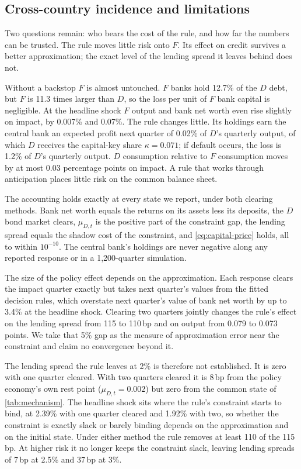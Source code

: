 \subsection{Cross-country incidence and limitations}
\label{sec:res-incidence}

Two questions remain: who bears the cost of the rule, and how far the numbers can be trusted.
The rule moves little risk onto $F$. Its effect on credit survives a better approximation; the
exact level of the lending spread it leaves behind does not.

Without a backstop $F$ is almost untouched. $F$ banks hold 12.7\% of the $D$ debt, but $F$ is
11.3 times larger than $D$, so the loss per unit of $F$ bank capital is negligible. At the
headline shock $F$ output and bank net worth even rise slightly on impact, by 0.007\% and
0.07\%. The rule changes little. Its holdings earn the central bank an expected profit next
quarter of 0.02\% of $D$'s quarterly output, of which $D$ receives the capital-key share
$\kappa=0.071$; if default occurs, the loss is 1.2\% of $D$'s quarterly output. $D$ consumption
relative to $F$ consumption moves by at most 0.03 percentage points on impact. A rule that works
through anticipation places little risk on the common balance sheet.

The accounting holds exactly at every state we report, under both clearing methods. Bank net
worth equals the returns on its assets less its deposits, the $D$ bond market clears, $\mu_{D,t}$
is the positive part of the constraint gap, the lending spread equals the shadow cost of the
constraint, and \eqref{eq:capital-price} holds, all to within $10^{-10}$. The central bank's
holdings are never negative along any reported response or in a 1,200-quarter simulation.

The size of the policy effect depends on the approximation. Each response clears the impact
quarter exactly but takes next quarter's values from the fitted decision rules, which overstate
next quarter's value of bank net worth by up to 3.4\% at the headline shock. Clearing two
quarters jointly changes the rule's effect on the lending spread from 115 to 110\,bp and on
output from 0.079 to 0.073 points. We take that 5\% gap as the measure of approximation error
near the constraint and claim no convergence beyond it.

The lending spread the rule leaves at 2\% is therefore not established. It is zero with one
quarter cleared. With two quarters cleared it is 8\,bp from the policy economy's own rest point
($\mu_{D,t}=0.002$) but zero from the common state of \cref{tab:mechanism}. The headline shock
sits where the rule's constraint starts to bind, at 2.39\% with one quarter cleared and 1.92\%
with two, so whether the constraint is exactly slack or barely binding depends on the
approximation and on the initial state. Under either method the rule removes at least 110 of the
115\,bp. At higher risk it no longer keeps the constraint slack, leaving lending spreads of
7\,bp at 2.5\% and 37\,bp at 3\%.
